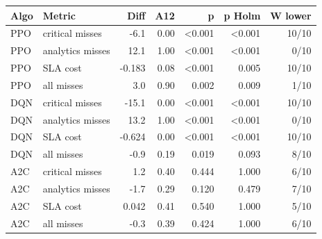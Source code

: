 \begin{tabular}{@{}llrrrrr@{}}
\toprule
Algo & Metric & Diff & A12 & p & p Holm & W lower \\
\midrule
PPO & critical misses & -6.1 & 0.00 & <0.001 & <0.001 & 10/10 \\
PPO & analytics misses & 12.1 & 1.00 & <0.001 & <0.001 & 0/10 \\
PPO & SLA cost & -0.183 & 0.08 & <0.001 & 0.005 & 10/10 \\
PPO & all misses & 3.0 & 0.90 & 0.002 & 0.009 & 1/10 \\
DQN & critical misses & -15.1 & 0.00 & <0.001 & <0.001 & 10/10 \\
DQN & analytics misses & 13.2 & 1.00 & <0.001 & <0.001 & 0/10 \\
DQN & SLA cost & -0.624 & 0.00 & <0.001 & <0.001 & 10/10 \\
DQN & all misses & -0.9 & 0.19 & 0.019 & 0.093 & 8/10 \\
A2C & critical misses & 1.2 & 0.40 & 0.444 & 1.000 & 6/10 \\
A2C & analytics misses & -1.7 & 0.29 & 0.120 & 0.479 & 7/10 \\
A2C & SLA cost & 0.042 & 0.41 & 0.540 & 1.000 & 5/10 \\
A2C & all misses & -0.3 & 0.39 & 0.424 & 1.000 & 6/10 \\
\bottomrule
\end{tabular}